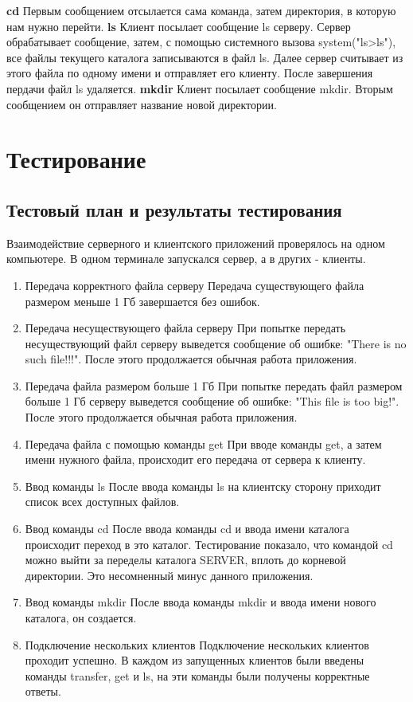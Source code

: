 \documentclass[12pt,a4paper]{report}
\begin{document}
\newline
\textbf{cd}\newline
Первым сообщением отсылается сама команда, затем директория, в которую нам нужно перейти.
\newline
\textbf{ls}\newline
Клиент посылает сообщение ls серверу. Сервер обрабатывает сообщение, затем, с помощью системного вызова system("ls>ls"), все файлы текущего каталога записываются в файл ls. Далее сервер считывает из этого файла по одному имени и отправляет его клиенту. После завершения пердачи файл ls удаляется.
\newline
\textbf{mkdir}\newline
Клиент посылает сообщение mkdir. Вторым сообщением он отправляет название новой директории.
\section{Тестирование}
\subsection{Тестовый план и результаты тестирования}
Взаимодействие серверного и клиентского приложений проверялось на одном компьютере. В одном терминале запускался сервер, а в других - клиенты.
\begin{enumerate}
\item{Передача корректного файла серверу}
Передача существующего файла размером меньше 1 Гб завершается без ошибок. 
\item{Передача несуществующего файла серверу}
При попытке передать несуществующий файл серверу выведется сообщение об ошибке: "There is no such file!!!". После этого продолжается обычная работа приложения.
\item{Передача файла размером больше 1 Гб}
При попытке передать файл размером больше 1 Гб серверу выведется сообщение об ошибке: "This file is too big!". После этого продолжается обычная работа приложения. 
\item{Передача файла с помощью команды get}
При вводе команды get, а затем имени нужного файла, происходит его передача от сервера к клиенту.
\item{Ввод команды ls}
После ввода команды ls на клиентску сторону приходит список всех доступных файлов.
\item{Ввод команды cd}
После ввода команды cd и ввода имени каталога происходит переход в это каталог. Тестирование показало, что командой cd можно выйти за переделы каталога SERVER, вплоть до корневой директории. Это несомненный минус данного приложения.
\item{Ввод команды mkdir}
После ввода команды mkdir и ввода имени нового каталога, он создается.
\item{Подключение нескольких клиентов}
Подключение нескольких клиентов проходит успешно. 
В каждом из запущенных клиентов были введены команды transfer, get и ls, на эти команды были получены корректные ответы.
\end{enumerate}
\end{document}
